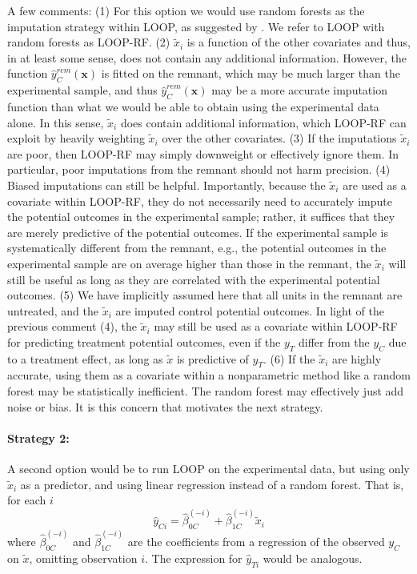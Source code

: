 A few comments: 
(1) For this option we would use random forests as the imputation strategy within LOOP, as suggested by \cite{loop}.  We refer to LOOP with random forests as LOOP-RF.
(2) $\tilde{x}_{i}$ is a function of the other covariates and thus, in at least some sense, does not contain any additional information.  However, the function $\hat{y}_C^{rem}(\mathbf{x})$  is fitted on the remnant, which may be much larger than the experimental sample, and thus $\hat{y}_C^{rem}(\mathbf{x})$ may be a more accurate imputation function than what we would be able to obtain using the experimental data alone.  In this sense, $\tilde{x}_{i}$ does contain additional information, which LOOP-RF can exploit by heavily weighting $\tilde{x}_{i}$ over the other covariates.  
(3) If the imputations $\tilde{x}_{i}$ are poor, then LOOP-RF may simply downweight or effectively ignore them.  In particular, poor imputations from the remnant should not harm precision.  
(4) Biased imputations can still be helpful.  Importantly, because the $\tilde{x}_{i}$ are used as a covariate within LOOP-RF, they do not necessarily need to accurately impute the potential outcomes in the experimental sample; rather, it suffices that they are merely predictive of the potential outcomes.  If the experimental sample is systematically different from the remnant,  e.g., the potential outcomes in the experimental sample are on average higher than those in the remnant, the $\tilde{x}_{i}$ will still be useful as long as they are correlated with the experimental potential outcomes.  
(5) We have implicitly assumed here that all units in the remnant are untreated, and the $\tilde{x}_{i}$ are imputed control potential outcomes.  In light of the previous comment (4), the $\tilde{x}_{i}$ may still be used as a covariate within LOOP-RF for predicting treatment potential outcomes, even if the $y_T$ differ from the $y_C$ due to a treatment effect, as long as $\tilde{x}$ is predictive of $y_T$.
(6) If the $\tilde{x}_{i}$ are highly accurate, using them as a covariate within a nonparametric method like a random forest may be statistically inefficient.  The random forest may effectively just add noise or bias.  It is this concern that motivates the next strategy.

\paragraph{Strategy 2:}  
A second option would be to run LOOP on the experimental data, but using only $\tilde{x}_{i}$ as a predictor, and using linear regression instead of a random forest.  That is, for each $i$
\begin{equation}
\hat{y}_{Ci} = \hat{\beta}_{0C}^{(-i)} + \hat{\beta}_{1C}^{(-i)}\tilde{x}_{i}
\end{equation}
where  $\hat{\beta}_{0C}^{(-i)}$ and $\hat{\beta}_{1C}^{(-i)}$ are the coefficients from a regression of the observed $y_C$ on $\tilde{x}$, omitting observation $i$.  The expression for $\hat{y}_{Ti}$ would be analogous.

